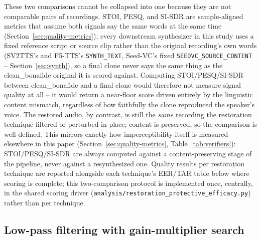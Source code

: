 \documentclass[11pt]{article}
\begin{document}
These two comparisons cannot be collapsed into one because they are not
comparable pairs of recordings. STOI, PESQ, and SI-SDR are
sample-aligned metrics that assume both signals say the same words at
the same time (Section~\ref{sec:quality-metrics}); every downstream
synthesizer in this study uses a fixed reference script or source
clip rather than the original recording's own words (SV2TTS's and
F5-TTS's \texttt{SYNTH\_TEXT}, Seed-VC's fixed
\texttt{SEEDVC\_SOURCE\_CONTENT} -- Section~\ref{sec:synth}), so a
final clone never says the same thing as the clean\_bonafide original
it is scored against. Computing STOI/PESQ/SI-SDR between clean\_bonafide
and a final clone would therefore not measure signal quality at all --
it would return a near-floor score driven entirely by the linguistic
content mismatch, regardless of how faithfully the clone reproduced the
speaker's voice. The restored audio, by contrast, is still the
\emph{same} recording the restoration technique filtered or perturbed
in place; content is preserved, so the comparison is well-defined. This
mirrors exactly how imperceptibility itself is measured elsewhere in
this paper (Section~\ref{sec:quality-metrics}, Table~\ref{tab:verifiers}):
STOI/PESQ/SI-SDR are always computed against a content-preserving stage
of the pipeline, never against a resynthesized one. Quality results per
restoration technique are reported alongside each technique's EER/TAR
table below where scoring is complete; this two-comparison protocol is
implemented once, centrally, in the shared scoring driver
(\texttt{analysis/restoration\_protective\_efficacy.py}) rather than
per technique.

\subsection{Low-pass filtering with gain-multiplier search}
\label{sec:restoration-lowpass-gain}
\end{document}
